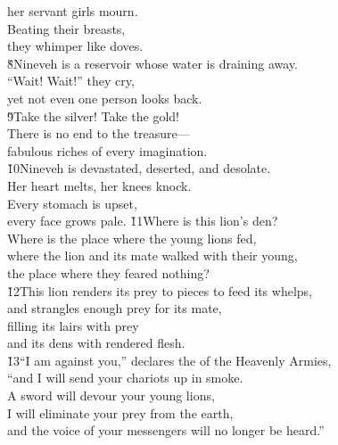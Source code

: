 \begin{poetry}
\poemlll       her servant girls mourn. \\
\poeml Beating their breasts, \\
\poemll    they whimper like doves. \\
\poeml \v{8}Nineveh is a reservoir whose water is draining away. \\
\poemll    ``Wait! Wait!'' they cry, \\
\poemlll       yet not even one person looks back. \\
\poeml \v{9}Take the silver! Take the gold! \\
\poemll    There is no end to the treasure--- \\
\poemlll       fabulous riches of every imagination. \\
\poeml \v{10}Nineveh is devastated, deserted, and desolate. \\
\poemll    Her heart melts, her knees knock. \\
\poeml Every stomach is upset, \\
\poemll    every face grows pale.
\poeml \v{11}Where is this lion's den? \\
\poemll    Where is the place where the young lions fed, \\
\poeml where the lion and its mate walked with their young, \\
\poemll    the place where they feared nothing? \\
\poeml \v{12}This lion renders its prey to pieces to feed its whelps, \\
\poemll    and strangles enough prey for its mate, \\
\poeml filling its lairs with prey \\
\poemll    and its dens with rendered flesh. \\
\poeml \v{13}``I am against you,'' declares the  of the Heavenly Armies, \\
\poemll    ``and I will send your chariots up in smoke. \\
\poeml A sword will devour your young lions, \\
\poemll    I will eliminate your prey from the earth, \\
\poemlll       and the voice of your messengers will no longer be heard.''
\end{poetry}

